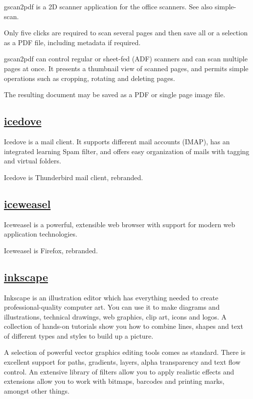 gscan2pdf is a 2D scanner application for the office scanners. See also
simple-scan.

 Only five clicks are required to scan several pages and then save all or a
 selection as a PDF file, including metadata if required.
 
 gscan2pdf can control regular or sheet-fed (ADF) scanners
 and can scan multiple pages at once.
 It presents a thumbnail view of scanned pages, and permits simple operations
 such as cropping, rotating and deleting pages.
 
 The resulting document may be saved as a PDF or
 single page image file.

\subsection{\href{http://www.mozilla.org/thunderbird/}{icedove}}

 Icedove is a mail client.
 It supports different mail accounts (IMAP), has an
 integrated learning Spam filter, and offers easy organization of mails with
 tagging and virtual folders.
 
 Icedove is Thunderbird mail client, rebranded.

\subsection{\href{https://www.mozilla.org/en-US/firefox/desktop/}{iceweasel}}

 Iceweasel is a powerful, extensible web browser
 with support for modern web application technologies.

 Iceweasel is Firefox, rebranded.

\subsection{\href{http://www.inkscape.org/}{inkscape}}

 Inkscape is an illustration editor which has everything needed to
 create professional-quality computer art. You can use it to make
 diagrams and illustrations, technical drawings, web graphics, clip art,
 icons and logos. A collection of hands-on tutorials show you how to
 combine lines, shapes and text of different types and styles to build
 up a picture.
 
 A selection of powerful vector graphics editing tools comes as
 standard. There is excellent support for paths, gradients, layers,
 alpha transparency and text flow control. An extensive library of
 filters allow you to apply realistic effects and extensions allow you
 to work with bitmaps, barcodes and printing marks, amongst other things.
 
